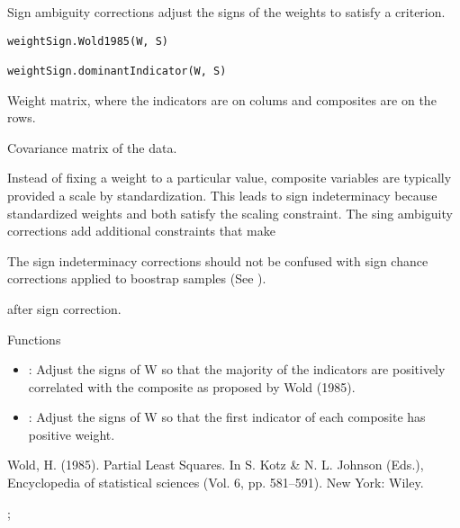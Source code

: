 \documentclass[a4paper]{book}
\begin{document}
%
\begin{Description}\relax
Sign ambiguity corrections adjust the signs of the weights to satisfy a criterion.
\end{Description}
%
\begin{Usage}
\begin{verbatim}
weightSign.Wold1985(W, S)

weightSign.dominantIndicator(W, S)
\end{verbatim}
\end{Usage}
%
\begin{Arguments}
\begin{ldescription}
\item[\code{W}] Weight matrix, where the indicators are on colums and composites are on the rows.

\item[\code{S}] Covariance matrix of the data.
\end{ldescription}
\end{Arguments}
%
\begin{Details}\relax
Instead of fixing a weight to a particular value, composite variables are typically provided a
scale by standardization. This leads to sign indeterminacy because standardized weights 
and  both satisfy the scaling constraint. The sing ambiguity corrections add additional
constraints that make 

The sign indeterminacy
corrections should not be confused with sign chance corrections applied to boostrap samples 
(See ).
\end{Details}
%
\begin{Value}
 after sign correction.
\end{Value}
%
\begin{Section}{Functions}
\begin{itemize}

\item{} : Adjust the signs of W so that the majority of the indicators are positively 
correlated with the composite as proposed by Wold (1985).

\item{} : Adjust the signs of W so that the first indicator of each composite has positive
weight.

\end{itemize}
\end{Section}
%
\begin{References}\relax
Wold, H. (1985). Partial Least Squares. In S. Kotz \& N. L. Johnson (Eds.), Encyclopedia  of 
statistical sciences (Vol. 6, pp. 581–591). New York: Wiley.
\end{References}
%
\begin{SeeAlso}\relax
{};
\end{SeeAlso}
\printindex{}
\end{document}
